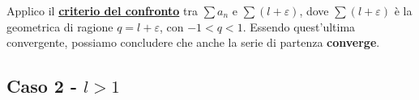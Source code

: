 \documentclass[../dimostrazioni]{subfiles}
\begin{document}
                Applico il \textbf{\hyperref[serieconfronto]{criterio del confronto}} tra \(\sum a_n\) e \(\sum(l + \varepsilon)\),
                dove \(\sum(l + \varepsilon)\) è la geometrica di ragione \(q = l + \varepsilon\), con \(-1 < q < 1\).
                Essendo quest'ultima convergente, possiamo concludere che anche la serie di partenza \textbf{converge}.

            \subsection*{Caso 2 - \(l > 1\)}

\end{document}
